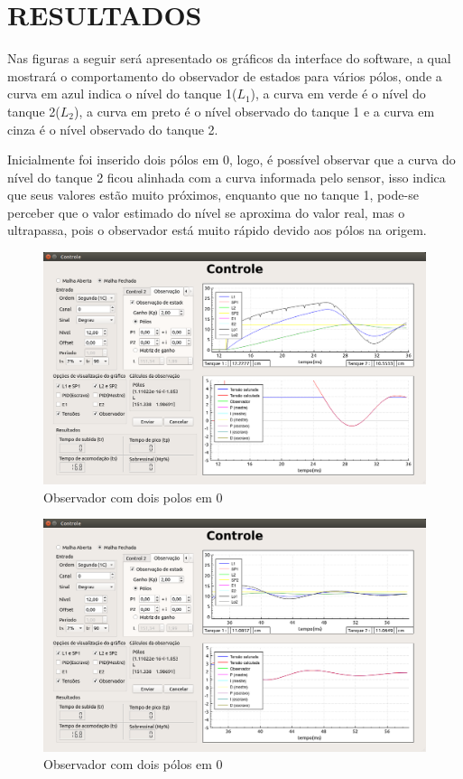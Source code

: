 \documentclass[a4paper,12pt]{article}
\begin{document}
\newpage


\thispagestyle{main}

\section{RESULTADOS}
\hspace{4ex}Nas figuras a seguir será apresentado os gráficos da interface do software, a qual mostrará o comportamento do observador de estados para vários pólos, onde a curva em azul indica o nível do tanque 1($L_1$), a curva em verde é o nível do tanque 2($L_2$), a curva em preto é o nível observado do tanque 1 e a curva em cinza é o nível observado do tanque 2.

\hspace{4ex}Inicialmente foi inserido dois pólos em 0, logo, é possível observar que a curva do nível do tanque 2 ficou alinhada com a curva informada pelo sensor, isso indica que seus valores estão muito próximos, enquanto que no tanque 1, pode-se perceber que o valor estimado do nível se aproxima do valor real, mas o ultrapassa, pois  o observador está muito rápido devido aos pólos na origem.
\begin{figure}[!h]
\centering
\includegraphics[width=13cm]{FotosObservador/PolosEm01}
\caption{Observador com dois polos em 0}
\label{img1}
\end{figure}
\begin{figure}[!h]
\centering
\includegraphics[width=13cm]{FotosObservador/PolosEm02}
\caption{Observador com dois pólos em 0}
\label{img2}
\end{figure}
\end{document}
